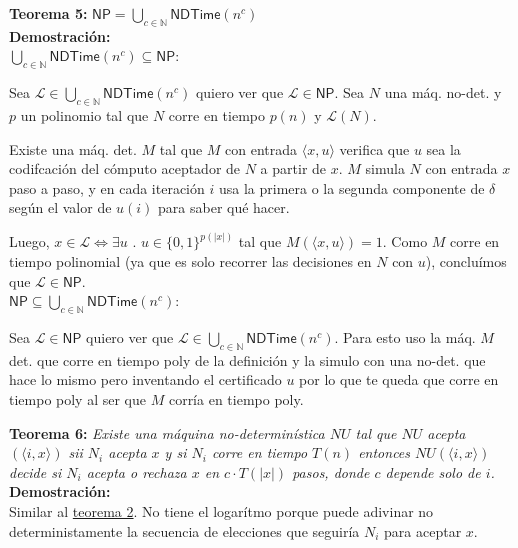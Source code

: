 \documentclass{article}
\begin{document}
\begin{flushleft}
  \textbf{Teorema 5:}
  $\mathsf{NP} = \bigcup_{c \in \mathbb{N}} \mathsf{NDTime}(n^c)$ \\[0.5 em]

  \textbf{\textcolor{Mulberry}{Demostración:}} \\[0.5em]

  \textcolor{Mulberry}{$\bigcup_{c \in \mathbb{N}} \mathsf{NDTime}(n^c) \subseteq \mathsf{NP}$:}

  Sea $\mathcal{L} \in \bigcup_{c \in \mathbb{N}} \mathsf{NDTime}(n^c)$ quiero ver que $\mathcal{L} \in 
  \mathsf{NP}$.
  Sea $N$ una máq. no-det. y $p$ un polinomio tal que $N$ corre en tiempo $p(n)$ y $\mathcal{L}(N)$.

  Existe una máq. det. $M$ tal que $M$ con entrada $\langle x,u \rangle$ verifica que $u$ sea la 
  codifcación del cómputo aceptador de $N$ a partir de $x$. 
  $M$ simula $N$ con entrada $x$ paso a paso, y en cada iteración $i$ usa la primera o la segunda 
  componente de $\delta$ según el valor de $u(i)$ para saber qué hacer.

  Luego, $x \in \mathcal{L} \iff \exists u$ . $u \in  \{ 0,1 \}^{p(|x|)}$ tal que $M(\langle x,u \rangle)
  = 1$. Como $M$ corre en tiempo polinomial (ya que es solo recorrer las decisiones en $N$ con $u$), 
  concluímos que $\mathcal{L} \in \mathsf{NP}$.\\[0.5em]

  \textcolor{Mulberry}{$\mathsf{NP} \subseteq \bigcup_{c \in \mathbb{N}} \mathsf{NDTime}(n^c)$:}

  Sea $\mathcal{L} \in \mathsf{NP}$ quiero ver que $\mathcal{L} \in \bigcup_{c \in \mathbb{N}} 
  \mathsf{NDTime}(n^c)$. Para esto uso la máq. $M$ det. que corre en tiempo poly de la definición y la 
  simulo con una no-det. que hace lo mismo pero inventando el certificado $u$ por lo que te queda que corre
  en tiempo poly al ser que $M$ corría en tiempo poly.
\end{flushleft}

\begin{flushleft}
  \textbf{\hypertarget{teo6}{Teorema 6:}}
  \textit{Existe una máquina no-determinística $NU$ tal que $NU$ acepta $(\langle i,x \rangle)$ sii $N_i$
  acepta $x$ y si $N_i$ corre en tiempo $T(n)$ entonces $NU(\langle i,x \rangle)$ decide si $N_i$ acepta o 
  rechaza $x$ en $c \cdot T(|x|)$ pasos, donde $c$ depende solo de $i$.} \\[0.5em]

  \textbf{\textcolor{Mulberry}{Demostración:}} \\[0.5em]

  Similar al \hyperlink{teo2}{\textcolor{Rhodamine}{teorema 2}}. No tiene el logarítmo porque puede 
  adivinar no deterministamente la secuencia de elecciones que  seguiría $N_i$ para aceptar $x$.
\end{flushleft}
\end{document}
